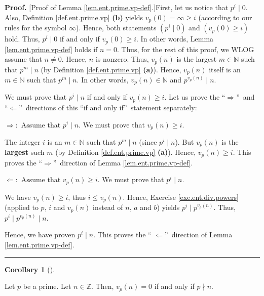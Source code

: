 \documentclass[numbers=enddot,12pt,final,onecolumn,notitlepage]{scrartcl}%
\numberwithin{exer}{subsection}
\theoremstyle{definition}
\newtheorem{coro}[theo]{Corollary}
\newenvironment{corollary}[1][]
{\begin{coro}[#1]\begin{leftbar}}
{\end{leftbar}\end{coro}}
\newenvironment{proof}[1][Proof]{\noindent\textbf{#1.} }{\ \rule{0.5em}{0.5em}}
\begin{document}
\begin{proof}
[Proof of Lemma \ref{lem.ent.prime.vp-def}.]First, let us notice that
$p^{i}\mid0$. Also, Definition \ref{def.ent.prime.vp} \textbf{(b)} yields
$v_{p}\left(  0\right)  =\infty\geq i$ (according to our rules for the symbol
$\infty$). Hence, both statements $\left(  p^{i}\mid0\right)  $ and $\left(
v_{p}\left(  0\right)  \geq i\right)  $ hold. Thus, $p^{i}\mid0$ if and only
if $v_{p}\left(  0\right)  \geq i$. In other words, Lemma
\ref{lem.ent.prime.vp-def} holds if $n=0$. Thus, for the rest of this proof,
we WLOG assume that $n\neq0$. Hence, $n$ is nonzero. Thus, $v_{p}\left(
n\right)  $ is the largest $m\in\mathbb{N}$ such that $p^{m}\mid n$ (by
Definition \ref{def.ent.prime.vp} \textbf{(a)}). Hence, $v_{p}\left(
n\right)  $ itself is an $m\in\mathbb{N}$ such that $p^{m}\mid n$. In other
words, $v_{p}\left(  n\right)  \in\mathbb{N}$ and $p^{v_{p}\left(  n\right)
}\mid n$.

We must prove that $p^{i}\mid n$ if and only if $v_{p}\left(  n\right)  \geq
i$. Let us prove the \textquotedblleft$\Longrightarrow$\textquotedblright\ and
\textquotedblleft$\Longleftarrow$\textquotedblright\ directions of this
\textquotedblleft if and only if\textquotedblright\ statement separately:

$\Longrightarrow:$ Assume that $p^{i}\mid n$. We must prove that $v_{p}\left(
n\right)  \geq i$.

The integer $i$ is an $m\in\mathbb{N}$ such that $p^{m}\mid n$ (since
$p^{i}\mid n$). But $v_{p}\left(  n\right)  $ is the \textbf{largest} such $m$
(by Definition \ref{def.ent.prime.vp} \textbf{(a)}). Hence, $v_{p}\left(
n\right)  \geq i$. This proves the \textquotedblleft$\Longrightarrow
$\textquotedblright\ direction of Lemma \ref{lem.ent.prime.vp-def}.

$\Longleftarrow:$ Assume that $v_{p}\left(  n\right)  \geq i$. We must prove
that $p^{i}\mid n$.

We have $v_{p}\left(  n\right)  \geq i$, thus $i\leq v_{p}\left(  n\right)  $.
Hence, Exercise \ref{exe.ent.div.powers} (applied to $p$, $i$ and
$v_{p}\left(  n\right)  $ instead of $n$, $a$ and $b$) yields $p^{i}\mid
p^{v_{p}\left(  n\right)  }$. Thus, $p^{i}\mid p^{v_{p}\left(  n\right)  }\mid
n$.

Hence, we have proven $p^{i}\mid n$. This proves the \textquotedblleft%
$\Longleftarrow$\textquotedblright\ direction of Lemma
\ref{lem.ent.prime.vp-def}.
\end{proof}

\begin{corollary}
\label{cor.ent.prime.vp-0}Let $p$ be a prime. Let $n\in\mathbb{Z}$. Then,
$v_{p}\left(  n\right)  =0$ if and only if $p\nmid n$.
\end{corollary}
\end{document}
